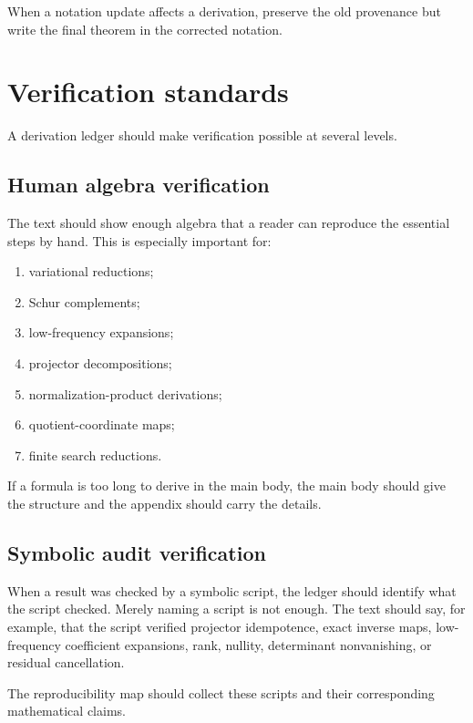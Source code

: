 When a notation update affects a derivation, preserve the old provenance but write the final theorem in the corrected notation.

\section{Verification standards}
\label{sec:verification-standards}

A derivation ledger should make verification possible at several levels.

\subsection{Human algebra verification}
\label{subsec:human-algebra-verification}

The text should show enough algebra that a reader can reproduce the essential steps by hand.  This is especially important for:
\begin{enumerate}[leftmargin=2.2em]
  \item variational reductions;
  \item Schur complements;
  \item low-frequency expansions;
  \item projector decompositions;
  \item normalization-product derivations;
  \item quotient-coordinate maps;
  \item finite search reductions.
\end{enumerate}

If a formula is too long to derive in the main body, the main body should give the structure and the appendix should carry the details.

\subsection{Symbolic audit verification}
\label{subsec:symbolic-audit-verification}

When a result was checked by a symbolic script, the ledger should identify what the script checked.  Merely naming a script is not enough.  The text should say, for example, that the script verified projector idempotence, exact inverse maps, low-frequency coefficient expansions, rank, nullity, determinant nonvanishing, or residual cancellation.

The reproducibility map should collect these scripts and their corresponding mathematical claims.

